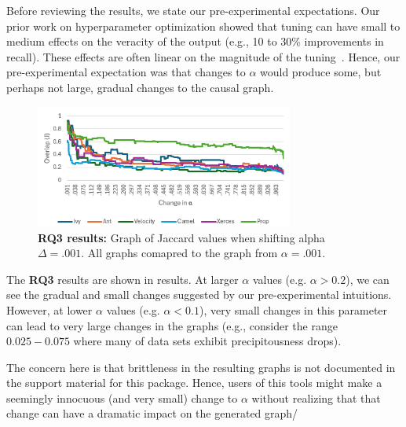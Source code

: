 \documentclass[]{svjour3}
\begin{document}
Before reviewing the results, we state our pre-experimental expectations. Our prior work on hyperparameter optimization showed that tuning can have small to medium effects on the veracity of the output (e.g., 10 to 30\% improvements in recall). These effects are often linear on the magnitude of the tuning~\cite{fu2016tuning}. Hence, our
pre-experimental expectation was that changes to $\alpha$ would produce some, but perhaps not large, gradual changes to the causal
graph.



\begin{figure}[!t]
\caption{{\bf RQ3 results:} Graph of Jaccard values when shifting alpha \(\Delta = .001\). All graphs comapred to the graph from $\alpha=.001$.}\label{Variable tuning graph}
\begin{center}\includegraphics[width=8.5cm]{images/RQ3.png}
\end{center}
\end{figure}

The {\bf RQ3} results are shown in results. 
At larger $\alpha$ values (e.g. $\alpha > 0.2$), we can see the gradual and small changes suggested by our pre-experimental intuitions.
However, at lower $\alpha$ values (e.g. $\alpha < 0.1$), very small changes
in this parameter can lead to very large changes in the graphs (e.g., consider the range $0.025-0.075$ where many of data sets exhibit precipitousness drops).
 
The concern here is that brittleness in the resulting graphs is not documented
in the support material for this package. Hence, users of this tools might make a seemingly innocuous (and very small) change to $\alpha$ without realizing that that change can have a dramatic impact on the generated graph/


\end{document}
